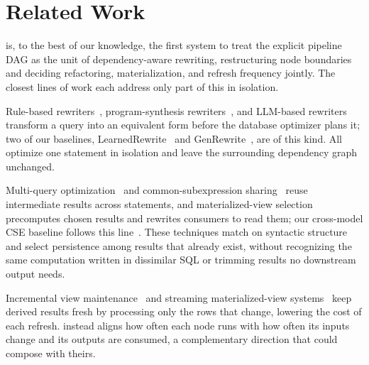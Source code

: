 
\section{Related Work}
\label{sec:related}


\tool is, to the best of our knowledge, the first system to treat the explicit pipeline DAG as the unit of dependency-aware rewriting, restructuring node boundaries and deciding refactoring, materialization, and refresh frequency jointly. The closest lines of work each address only part of this in isolation.

Rule-based rewriters~\cite{wetune,learnedrewrite}, program-synthesis rewriters~\cite{slabcity}, and LLM-based rewriters~\cite{genrewrite,rbot,llmr2} transform a query into an equivalent form before the database optimizer plans it; two of our baselines, LearnedRewrite~\cite{learnedrewrite} and GenRewrite~\cite{genrewrite}, are of this kind. All optimize one statement in isolation and leave the surrounding dependency graph unchanged.

Multi-query optimization~\cite{sellis1988multiple,roy2000efficient} and common-subexpression sharing~\cite{scopeCSE,similarSubexpr} reuse intermediate results across statements, and materialized-view selection~\cite{agrawal2000automated,harinarayan1996implementing} precomputes chosen results and rewrites consumers to read them; our cross-model CSE baseline follows this line~\cite{scopeCSE}. These techniques match on syntactic structure and select persistence among results that already exist, without recognizing the same computation written in dissimilar SQL or trimming results no downstream output needs.


Incremental view maintenance~\cite{ivm} and streaming materialized-view systems~\cite{materialize,risingwave} keep derived results fresh by processing only the rows that change, lowering the cost of each refresh. \tool instead aligns how often each node runs with how often its inputs change and its outputs are consumed, a complementary direction that could compose with theirs.

